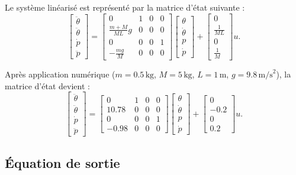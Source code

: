 \documentclass{report}
\begin{document}
Le système linéarisé est représenté par la matrice d'état suivante :
\[
\begin{bmatrix}
\ddot{\theta} \\
\ddot{\theta} \\
\dot{p} \\
\ddot{p}
\end{bmatrix}
=
\begin{bmatrix}
0 & 1 & 0 & 0 \\
\frac{m+M}{ML}g & 0 & 0 & 0 \\
0 & 0 & 0 & 1 \\
-\frac{mg}{M} & 0 & 0 & 0
\end{bmatrix}
\begin{bmatrix}
\theta \\
\dot{\theta} \\
p \\
\dot{p}
\end{bmatrix}
+
\begin{bmatrix}
0 \\
\frac{1}{ML} \\
0 \\
\frac{1}{M}
\end{bmatrix}
u.
\]

Après application numérique (\( m = 0.5 \, \text{kg} \), \( M = 5 \, \text{kg} \), \( L = 1 \, \text{m} \), \( g = 9.8 \, \text{m/s}^2 \)), la matrice d'état devient :
\[
\begin{bmatrix}
\ddot{\theta} \\
\ddot{\theta} \\
\dot{p} \\
\ddot{p}
\end{bmatrix}
=
\begin{bmatrix}
0 & 1 & 0 & 0 \\
10.78 & 0 & 0 & 0 \\
0 & 0 & 0 & 1 \\
-0.98 & 0 & 0 & 0
\end{bmatrix}
\begin{bmatrix}
\theta \\
\dot{\theta} \\
p \\
\dot{p}
\end{bmatrix}
+
\begin{bmatrix}
0 \\
-0.2 \\
0 \\
0.2
\end{bmatrix}
u.
\]

\subsection{Équation de sortie}
\end{document}
